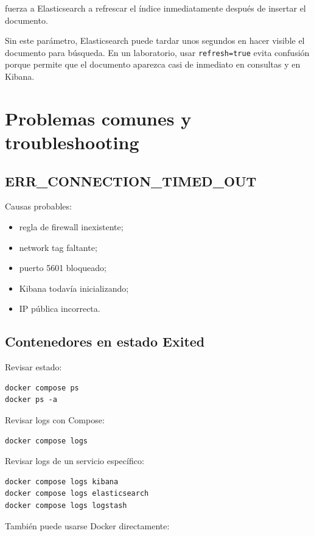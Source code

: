 \documentclass[
  coursetitle={Cómputo Nube y Tecnologías Emergentes},
  coursehours={96},
  coursedate={Verano 2026},
  doctype={Laboratorio},
  otherlangs={english,french},
  authorname={Lázaro},
  authorsurname={Bustio-Martínez},
  authortitle={PhD},
  role={Profesor Investigador},
  email={lbustio@inaoe.mx},
  phone={5559504000},
  ext={7459},
  institution={Instituto Nacional de Astrofísica, Óptica y Electrónica (INAOE)},
  department={Maestría en Ciencias en Tecnologías de Seguridad},
  address={Luis Enrique Erro 1, Sta. Ma. Tonantzintla, San Andrés Cholula, CP 72840, Puebla, México},
  margin={0.5in}
]{../../lbustio_lecture_notes}
\begin{document}
fuerza a Elasticsearch a refrescar el índice inmediatamente después de insertar el documento.

Sin este parámetro, Elasticsearch puede tardar unos segundos en hacer visible el documento para búsqueda. En un laboratorio, usar \texttt{refresh=true} evita confusión porque permite que el documento aparezca casi de inmediato en consultas y en Kibana.

\section{Problemas comunes y troubleshooting}

\subsection{ERR\_CONNECTION\_TIMED\_OUT}

Causas probables:

\begin{itemize}
    \item regla de firewall inexistente;
    \item network tag faltante;
    \item puerto 5601 bloqueado;
    \item Kibana todavía inicializando;
    \item IP pública incorrecta.
\end{itemize}

\subsection{Contenedores en estado Exited}

Revisar estado:

\begin{lstlisting}
docker compose ps
docker ps -a
\end{lstlisting}

Revisar logs con Compose:

\begin{lstlisting}
docker compose logs
\end{lstlisting}

Revisar logs de un servicio específico:

\begin{lstlisting}
docker compose logs kibana
docker compose logs elasticsearch
docker compose logs logstash
\end{lstlisting}

También puede usarse Docker directamente:
\end{document}
